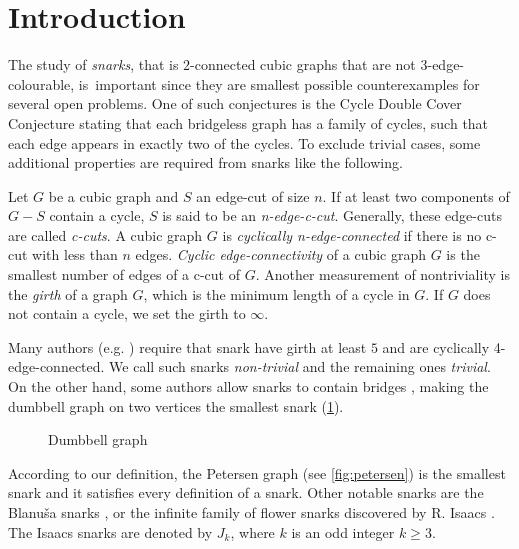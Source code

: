 \section{Introduction}


The study of \textit{snarks}, that is $2$-connected cubic graphs that are not 3-edge-colourable, is~important since they are smallest possible counterexamples for several open problems.
One of such conjectures is the Cycle Double Cover Conjecture stating that each bridgeless graph has a family of cycles, such that each edge appears in exactly two of the cycles.
To exclude trivial cases, some additional properties are required from snarks like the following.

Let $G$ be a cubic graph and $S$ an edge-cut of size $n$. If at least two components of $G - S$ contain a cycle, $S$ is said to be an \textit{n-edge-c-cut}. Generally, these edge-cuts are called \textit{c-cuts}. 
A cubic graph $G$ is \textit{cyclically n-edge-connected} if there is no c-cut with less than $n$ edges. \textit{Cyclic edge-connectivity} of a cubic graph $G$ is the smallest number of edges of a c-cut of $G$.
Another measurement of nontriviality is the \textit{girth} of a graph $G$, which is the minimum length of a cycle in $G$. If $G$ does not contain a cycle, we set the girth to $\infty$.

Many authors (e.g. \cite{Preissmann1983, Nedela1996}) require that snark have girth at least $5$ and are cyclically 4-edge-connected. We call such snarks \emph{non-trivial} and the remaining ones \emph{trivial}. On the other hand, some authors allow snarks to contain bridges \cite{IrreducibleSnarksSkoviera}, making the dumbbell graph on two vertices the smallest snark (\cref{fig:dumbbell}).

\begin{figure}
	\centering
	
	\caption{Dumbbell graph}
	\label{fig:dumbbell}
\end{figure}

According to our definition, the Petersen graph (see \cref{fig:petersen}) is the smallest snark and it satisfies every definition of a snark. Other notable snarks are the Blanuša snarks \cite{TODO}, or the infinite family of flower snarks discovered by R. Isaacs \cite{Isaacs1975}. The Isaacs snarks are denoted by $J_k$, where $k$ is an odd integer $k\geq 3$.

